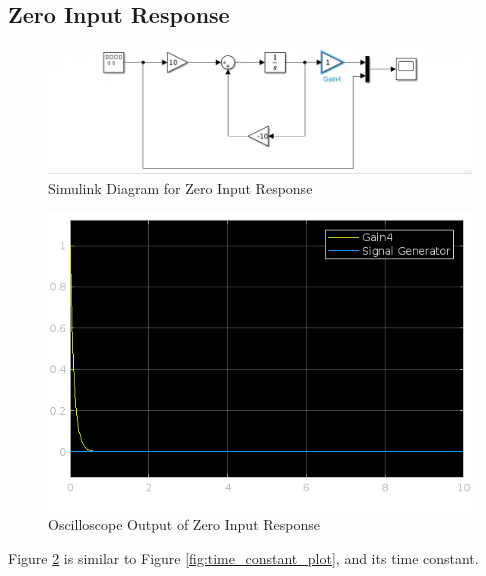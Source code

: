 \documentclass[12pt]{article}
\begin{document}
		\subsection{Zero Input Response}
			\begin{figure}[H]
				\centering
				\includegraphics[width=1\linewidth]{"Code/Fig/part2_1_slx.png"} %
				\caption{Simulink Diagram for Zero Input Response}
				\label{fig:slx_zero_input_diagram}
			\end{figure}	
			\begin{figure}[H]
				\centering
				\includegraphics[width=1\linewidth]{"Code/Fig/zero_input_output.png"} 
				\caption{Oscilloscope Output of Zero Input Response}
				\label{fig:slx_zero_input_output}
			\end{figure}
			Figure \ref{fig:slx_zero_input_output} is similar to Figure \ref{fig:time_constant_plot}, and its time constant.
\end{document}
